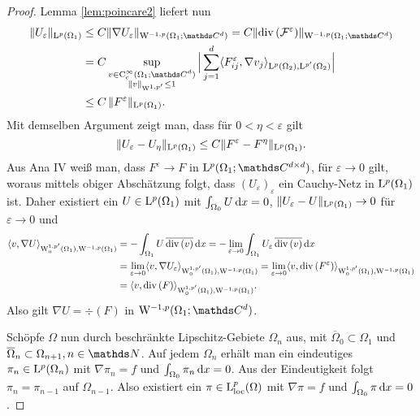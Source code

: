 \begin{proof}
  Lemma \ref{lem:poincare2} liefert nun
  \begin{align*}
  \| U_\varepsilon\|_{\Ell^p(\Omega_1)} 
  &\leq C \|\nabla U_\varepsilon\|_{\WW^{-1,p}(\Omega_1; \C^d)} 
    = C \| \div(\F^\varepsilon)\|_{\WW^{-1,p}(\Omega_1;\C^d)} \\
    &= C \sup_{\substack{v \in \CC_{\cc}^\infty(\Omega_1; \C^d) \\ \|v\|_{\WW^{1,p'}} \leq 1}} \Big| \sum_{j = 1}^d \langle F_{ij}^\varepsilon, \nabla v_j \rangle_{\Ell^p(\Omega_2), \Ell^{p'}(\Omega_2)} \Big| \\
    &\leq C \, \|F^\varepsilon\|_{\Ell^p(\Omega_1)}.
  \end{align*}
  Mit demselben Argument zeigt man, dass für $0< \eta < \varepsilon$ gilt
  $$
  \|U_\varepsilon - U_\eta \|_{\mathrm{L}^p(\Omega_1)} \leq C \| F^\varepsilon - F^\eta\|_{\mathrm{L}^p(\Omega_1)}.
  $$
  Aus Ana IV weiß man, dass $F^\varepsilon \to F$ in $\Ell^p(\Omega_1; \C^{d\times d})$, für $\varepsilon \to 0$ gilt, woraus mittels obiger Abschätzung folgt, dass $(U_\varepsilon)_\varepsilon$ ein Cauchy-Netz in $\mathrm{L}^p(\Omega_1)$ ist.
  Daher existiert ein $U \in \mathrm{L}^p(\Omega_1)$ mit $\int_{\Omega_0} U \, {\operatorname{d}\!{x}} = 0$, $\|U_\varepsilon - U\|_{\mathrm{L}^p(\Omega_1)} \to 0$ für $\varepsilon \to 0$ und
  \begin{align*}
    \langle v, \nabla U \rangle_{\mathrm{W}_0^{1,p'}(\Omega_1), \mathrm{W}^{-1,p}(\Omega_1)}
    &= - \int_{\Omega_1} U \, \overline{\mathrm{div\,} (v) } \, {\operatorname{d}\!{x}}
    = - \lim_{\varepsilon \to 0} \int_{\Omega_1} U_\varepsilon \, \overline{\mathrm{div\,} (v)} \, {\operatorname{d}\!{x}} \\
    &= \lim_{\varepsilon \to 0} \langle v, \nabla U_\varepsilon \rangle_{\mathrm{W}_0^{1,p'}(\Omega_1), \mathrm{W}^{-1, p}(\Omega_1)}
    = \lim_{\varepsilon \to 0} \langle v, \mathrm{div\,} (F^\varepsilon) \rangle_{\mathrm{W}_0^{1,p'}(\Omega_1), \mathrm{W}^{-1, p}(\Omega_1)} \\
     &= \langle v, \mathrm{div\,} (F) \rangle_{\mathrm{W}_0^{1,p'}(\Omega_1), \mathrm{W}^{-1, p}(\Omega_1)}.
  \end{align*}
  Also gilt $\nabla U = \div(F)$ in $\WW^{-1,p}(\Omega_1; \C^d)$.
  
  Schöpfe $\Omega$ nun durch beschränkte Lipschitz-Gebiete $\Omega_n$ aus, mit $\overline\Omega_0 \subset \Omega_1$ und $\overline\Omega_n \subset \Omega_{n + 1}, n \in \N$.
  Auf jedem $\Omega_n$ erhält man ein eindeutiges $\pi_n \in \mathrm{L}^p(\Omega_n)$ mit $\nabla \pi_n = f$ und $\int_{\Omega_0} \pi_n \, {\operatorname{d}\!{x}} = 0$.
  Aus der Eindeutigkeit folgt $\pi_n = \pi_{n -1}$ auf $\Omega_{n - 1}$.
  Also existiert ein $\pi \in \mathrm{L}^p_{\operatorname{loc}}(\Omega)$ mit $\nabla\pi = f$ und $\int_{\Omega_0} \pi \, {\operatorname{d}\!{x}} = 0$.
\end{proof}

